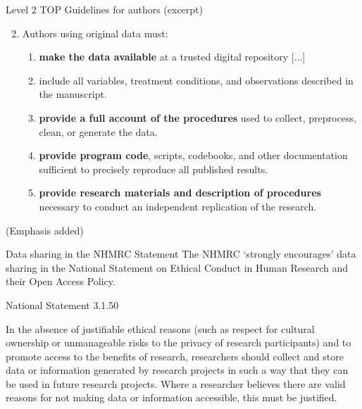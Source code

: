 \documentclass[aspectratio=169, 11pt]{beamer} %
\begin{document}
\begin{frame}{Level 2 TOP Guidelines for authors (excerpt)}
  
    \begin{enumerate}[label=\arabic*.]
        \setcounter{enumi}{1}
        
        \item Authors using original data must:
        \begin{enumerate}[label=\alph*.]
            \item \textbf{make the data available} at a trusted digital repository [...]
            \item include all variables, treatment conditions, and observations described in the manuscript.
            \item \textbf{provide a full account of the procedures} used to collect, preprocess, clean, or generate the data.
            \item \textbf{provide program code}, scripts, codebooks, and other documentation sufficient to precisely reproduce all published results.
            \item \textbf{provide research materials and description of procedures} necessary to conduct an independent replication of the research.
        \end{enumerate}
    \end{enumerate}
    (Emphasis added) \cite{Osf2014-pf}
\end{frame}

\begin{frame}{Data sharing in the NHMRC Statement}
    The NHMRC `strongly encourages' data sharing in the National Statement on Ethical Conduct in Human Research and their Open Access Policy. \cite{Nhmrc2018-sj, Nhmrc2018-vn} \par
    National Statement 3.1.50 \par
    In the absence of justifiable ethical reasons (such as respect for cultural ownership or unmanageable risks to the privacy of research participants) and to promote access to the benefits of research, researchers should collect and store data or information generated by research projects in such a way that they can be used in future research projects. Where a researcher believes there are valid reasons for not making data or information accessible, this must be justified.
\end{frame}
\end{document}
